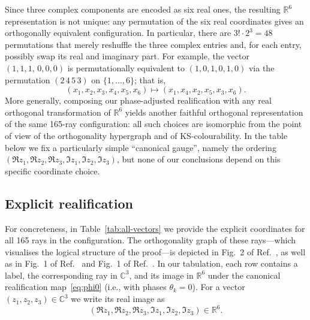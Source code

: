 \documentclass[%
  reprint,
  superscriptaddress,
  amsmath,amssymb,
  pra,
  floatfix,
  longbibliography
]{revtex4-2}
\begin{document}
Since three complex components are encoded as six real ones, the resulting
$\mathbb{R}^6$ representation is not unique: any permutation of the six real
coordinates gives an orthogonally equivalent configuration. In particular,
there are $3!\cdot 2^3 = 48$ permutations that merely reshuffle the three
complex entries and, for each entry, possibly swap its real and imaginary
part. For example, the vector $(1,1,1,\,0,0,0)$ is permutationally
equivalent to $(1,0,1,0,1,0)$ via the permutation $(2\,4\,5\,3)$ on
$\{1,\dots,6\}$; that is,
\[
(x_1,x_2,x_3,x_4,x_5,x_6)\mapsto(x_1,x_4,x_2,x_5,x_3,x_6).
\]
More generally, composing our phase-adjusted realification with any real
orthogonal transformation of $\mathbb{R}^6$ yields another faithful orthogonal
representation of the same 165-ray configuration: all such choices are
isomorphic from the point of view of the orthogonality hypergraph and of
KS-colourability. In the table below we fix a particularly simple
``canonical gauge'', namely the ordering
$(\Re z_1,\Re z_2,\Re z_3,\Im z_1,\Im z_2,\Im z_3)$, but none of our
conclusions depend on this specific coordinate choice.

\subsection{Explicit realification}
\label{sec:explicit_realification}


For concreteness, in Table~\ref{tab:all-vectors} we provide the explicit coordinates for all 165 rays in the configuration. The orthogonality graph of these rays---which visualises the logical structure of the proof---is depicted in Fig.~2 of Ref.~\cite{harding2025remarksIJTP}, as well as in Fig.~1 of Ref.~\cite{Cabello2025} and Fig.~1 of Ref.~\cite{svozil-2025-MYOCHS}. In our tabulation, each row contains a label, the corresponding ray in $\mathbb{C}^3$, and its image in $\mathbb{R}^6$ under the canonical realification map~\eqref{eq:phi0} (i.e., with phases $\theta_k=0$). For a vector $(z_1,z_2,z_3)\in\mathbb{C}^3$ we write its real image as
\begin{equation}
  (\Re z_1,\Re z_2,\Re z_3,\Im z_1,\Im z_2,\Im z_3)\in\mathbb{R}^6.
\end{equation}
\end{document}
